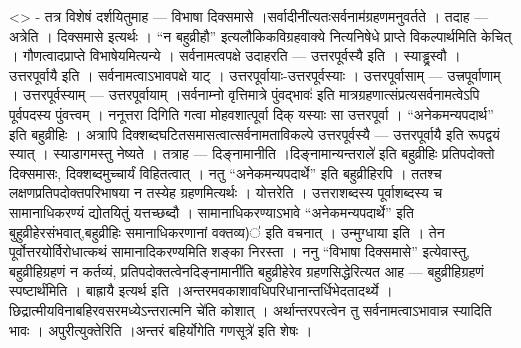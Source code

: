\textless{}\textgreater{} - तत्र विशेषं दर्शयितुमाह --- विभाषा दिक्समासे
।सर्वादीनी॑त्यतःसर्वनाम॑ग्रहणमनुवर्तते । तदाह --- अत्रेति । दिक्समासे
इत्यर्थः । ``न बहुव्रीहौ'' इत्यलौकिकविग्रहवाक्ये नित्यनिषेधे प्राप्ते
विकल्पार्थमिति केचित् । गौणत्वादप्राप्ते विभाषेयमित्यन्ये ।
सर्वनामत्वपक्षे उदाहरति --- उत्तरपूर्वस्यै इति । स्याड्ढ्रस्वौ ।
उत्तरपूर्वायै इति । सर्वनामत्वाऽभावपक्षे याट् ।
उत्तरपूर्वायाः-उत्तरपूर्वस्याः । उत्तरपूर्वासाम् --- उत्त्रपूर्वाणाम् ।
उत्तरपूर्वस्याम् --- उत्तरपूर्वायाम् ।सर्वनाम्नो वृत्तिमात्रे
पुंवद्भावः॑ इति मात्रग्रहणात्संप्रत्यसर्वनामत्वेऽपि पूर्वपदस्य
पुंवत्त्वम् । ननूत्तरा दिगिति गत्वा मोहवशात्पूर्वा दिक् यस्याः सा
उत्तरपूर्वा । ``अनेकमन्यपदार्थ'' इति बहुव्रीहिः । अत्रापि
दिक्शब्दघटितसमासत्वात्सर्वनामताविकल्पे उत्तरपूर्वस्यै --- उत्तरपूर्वायै
इति रूपद्वयं स्यात् । स्याडागमस्तु नेष्यते । तत्राह --- दिङ्नामानीति
।दिङ्नामान्यन्तराले॑ इति बहुव्रीहिः प्रतिपदोक्तो दिक्समासः,
दिक्शब्दमुच्चार्यं विहितत्वात् । नतु ``अनेकमन्यपदार्थे'' इति
बहुव्रीहिरपि । ततश्च लक्षणप्रतिपदोक्तपरिभाषया न तस्येह ग्रहणमित्यर्थः ।
योत्तरेति । उत्तराशब्दस्य पूर्वाशब्दस्य च सामानाधिकरण्यं द्योतयितुं
यत्तच्छब्दौ । सामानाधिकरण्याऽभावे ``अनेकमन्यपदार्थे'' इति
बुहुव्रीहेरसंभवात्,बहुव्रीहिः समानाधिकरणानां वक्तव्य)॑ इति वचनात् ।
उन्मुग्धाया इति । तेन पूर्वोत्तरयोर्विरोधात्कथं सामानादिकरण्यमिति शङ्का
निरस्ता । ननु ``विभाषा दिक्समासे'' इत्येवास्तु, बहुव्रीहिग्रहणं न
कर्तव्यं, प्रतिपदोक्तत्वेनदिङ्नामानी॑ति बहुव्रीहेरेव ग्रहणसिद्धेरित्यत
आह --- बहुव्रीहिग्रहणं स्पष्टार्थंमिति । बाह्रायै इत्यर्थ इति
।अन्तरमवकाशावधिपरिधानान्तर्धिभेदतादर्थ्ये ।
छिद्रात्मीयविनाबहिरवसरमध्येऽन्तरात्मनि चे॑ति कोशात् । अर्थान्तरपरत्वेन
तु सर्वनामत्वाऽभावान्न स्यादिति भावः । अपुरीत्युक्तेरिति ।अन्तरं
बहिर्योगेति गणसूत्रे॑ इति शेषः ।
